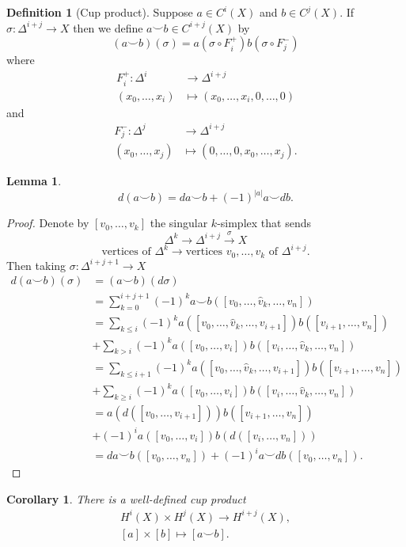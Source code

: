 \documentclass[10pt,]{book}
\newcommand{\gt}{>}
\theoremstyle{plain}
\newtheorem{corollary}[theorem]{Corollary}
\newtheorem{lemma}[theorem]{Lemma}
\theoremstyle{definition}
\newtheorem{definition}[theorem]{Definition}
\numberwithin{equation}{section}
\begin{document}
\begin{definition}[Cup product]\label{definition-26}
Suppose \(a\in C^i(X)\) and \(b\in C^j(X)\).
            If \(\sigma\colon \Delta^{i+j} \to X\) then we define \(a\smile b\in C^{i+j}(X)\) by
            \[(a\smile b)(\sigma) = a(\sigma\circ F_i^+)b(\sigma\circ F_j^-)\]
            where
            \begin{align*}
F_i^+\colon \Delta^i &\to \Delta^{i+j}\\
(x_0,\ldots,x_i) &\mapsto (x_0,\ldots,x_i,0,\ldots,0)
\end{align*}
            and
            \begin{align*}
F_j^-\colon \Delta^j &\to \Delta^{i+j}\\
(x_0,\ldots,x_j) &\mapsto (0,\ldots,0,x_0,\ldots,x_j).
\end{align*}\end{definition}
\begin{lemma}\label{lemma-9}
\[d(a\smile b) = da\smile b + (-1)^{|a|} a\smile db.\]\end{lemma}
\begin{proof}
Denote by \([v_0,\ldots,v_k]\) the singular \(k\)-simplex that sends
            \[\Delta^k\to\Delta^{i+j}\xrightarrow{\sigma} X\]\[\text{vertices of }\Delta^k\to\text{vertices }v_0,\ldots,v_k\text{ of }\Delta^{i+j}.\]
            Then taking \(\sigma\colon \Delta^{i+j+1} \to X\)\begin{align*}
d(a\smile b)(\sigma) &=(a\smile b)(d\sigma)\\
&=\sum_{k=0}^{i+j+1}(-1)^k a\smile b([v_0,\ldots,\hat v_k,\ldots,v_n])\\
&=\sum_{k\le i}(-1)^k a([v_0,\ldots,\hat v_k,\ldots,v_{i+1}])b([v_{i+1},\ldots,v_n])\\
&+\sum_{k\gt i}(-1)^k a([v_0,\ldots,v_{i}])b([v_{i},\ldots,\hat v_k,\ldots,v_n])\\
&=\sum_{k\le i + 1}(-1)^k a([v_0,\ldots,\hat v_k,\ldots,v_{i+1}])b([v_{i+1},\ldots,v_n])\\
&+\sum_{k\ge i}(-1)^k a([v_0,\ldots,v_{i}])b([v_{i},\ldots,\hat v_k,\ldots,v_n])\\
&=a(d([v_0,\ldots,v_{i+1}]))b([v_{i+1},\ldots,v_n])\\
&+ (-1)^i a([v_0,\ldots,v_{i}])b(d([v_{i},\ldots,v_n]))\\
&= da\smile b([v_0,\ldots,v_n]) + (-1)^i a\smile db([v_0,\ldots,v_n]).
\end{align*}\end{proof}
\begin{corollary}\label{corollary-11}
There is a well-defined cup product
            \begin{gather*}
 H^i(X) \times H^j(X) \to H^{i+j}(X),\\
 [a]    \times [b]    \mapsto [a\smile b].
\end{gather*}\end{corollary}
\end{document}
